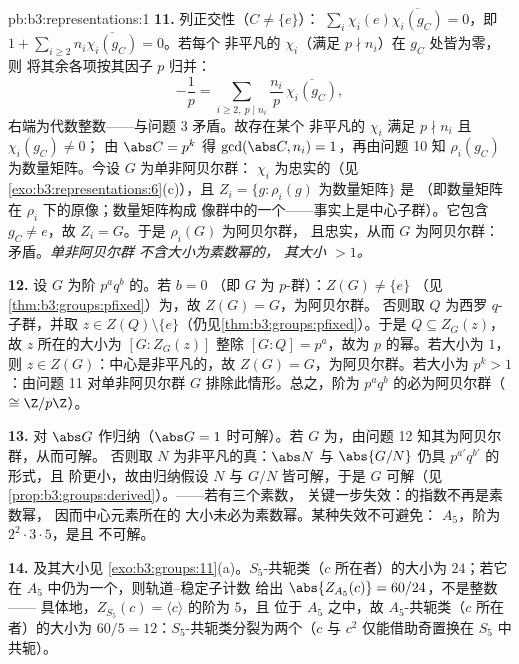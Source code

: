 \begin{solution}{pb:b3:representations:1}
\textbf{11.} 列正交性（$C \neq \{e\}$）：
$\sum_i \chi_i(e)\overline{\chi_i(g_C)} = 0$，即 $1 +
\sum_{i \geq 2} n_i\overline{\chi_i(g_C)} = 0$。若每个
非平凡的 $\chi_i$（满足 $p \nmid n_i$）在 $g_C$ 处皆为零，则
将其余各项按其因子 $p$ 归并：
\[
-\frac1p = \sum_{i \geq 2,\ p \mid n_i}
\frac{n_i}{p}\,\overline{\chi_i(g_C)},
\]
右端为代数整数——与问题 3 矛盾。故存在某个
非平凡的 $\chi_i$ 满足 $p \nmid n_i$ 且 $\chi_i(g_C) \neq 0$；
由 $\abs C = p^k$ 得 $\gcd(\abs C, n_i) = 1$，再由问题 10
知 $\rho_i(g_C)$ 为数量矩阵。今设 $G$ 为单非阿贝尔群：
$\chi_i$ 为忠实的（见\cref{exo:b3:representations:6}(c)），且
$Z_i = \{g : \rho_i(g) \text{ 为数量矩阵}\}$ 是
（即数量矩阵在 $\rho_i$ 下的原像；数量矩阵构成
像群中的一个——事实上是中心子群）。它包含
$g_C \neq e$，故 $Z_i = G$。于是 $\rho_i(G)$ 为阿贝尔群，
且忠实，从而 $G$ 为阿贝尔群：矛盾。\emph{单非阿贝尔群
不含大小为素数幂的，
其大小 $> 1$。}

\textbf{12.} 设 $G$ 为阶 $p^aq^b$ 的。若 $b = 0$
（即 $G$ 为 $p$-群）：$Z(G) \neq \{e\}$
（见\cref{thm:b3:groups:pfixed}）为，故 $Z(G) = G$，为阿贝尔群。
否则取 $Q$ 为西罗 $q$-子群，并取 $z \in Z(Q)
\setminus\{e\}$（仍见\cref{thm:b3:groups:pfixed}）。于是 $Q
\subseteq Z_G(z)$，故 $z$ 所在的大小为 $[G : Z_G(z)]$
整除 $[G : Q] = p^a$，故为 $p$ 的幂。若大小为 $1$，
则 $z \in Z(G)$：中心是非平凡的，故
$Z(G) = G$，为阿贝尔群。若大小为 $p^k > 1$：由问题 11
对单非阿贝尔群 $G$ 排除此情形。总之，阶为
$p^aq^b$ 的必为阿贝尔群（$\cong \Z/p\Z$）。

\textbf{13.} 对 $\abs G$ 作归纳（$\abs G = 1$ 时可解）。若
$G$ 为，由问题 12 知其为阿贝尔群，从而可解。
否则取 $N$ 为非平凡的真：$\abs
N$ 与 $\abs{G/N}$ 仍具 $p^{a'}q^{b'}$ 的形式，且
阶更小，故由归纳假设 $N$ 与 $G/N$ 皆可解，于是 $G$
可解（见\cref{prop:b3:groups:derived}）。——若有三个素数，
关键一步失效：的指数不再是素数幂，
因而中心元素所在的
大小未必为素数幂。某种失效不可避免：
$A_5$，阶为 $2^2\cdot3\cdot5$，是且
不可解。

\textbf{14.} 及其大小见
\cref{exo:b3:groups:11}(a)。$S_5$-共轭类（$c$ 所在者）的大小为
$24$；若它在 $A_5$ 中仍为一个，则轨道--稳定子计数
给出 $\abs{Z_{A_5}(c)} = 60/24$，不是整数——
具体地，$Z_{S_5}(c) = \langle c\rangle$ 的阶为 $5$，且
位于 $A_5$ 之中，故 $A_5$-共轭类（$c$ 所在者）的大小为 $60/5 =
12$：$S_5$-共轭类分裂为两个（$c$ 与 $c^2$
仅能借助奇置换在 $S_5$ 中共轭）。


\end{solution}
